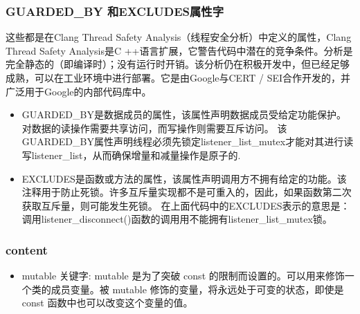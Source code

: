 \begin{frame}
\frametitle{GUARDED\_BY 和EXCLUDES属性字}


这些都是在Clang Thread Safety Analysis（线程安全分析）中定义的属性，Clang Thread Safety Analysis是C ++语言扩展，它警告代码中潜在的竞争条件。分析是完全静态的（即编译时）；没有运行时开销。该分析仍在积极开发中，但已经足够成熟，可以在工业环境中进行部署。它是由Google与CERT / SEI合作开发的，并广泛用于Google的内部代码库中。
\begin{itemize}
	\item GUARDED\_BY是{\color{red}数据成员}的属性，该属性声明数据成员受给定功能保护。{\color{red}对数据的读操作需要共享访问，而写操作则需要互斥访问}。
该GUARDED\_BY属性声明线程必须先锁定listener\_list\_mutex才能对其进行读写listener\_list，从而确保增量和减量操作是原子的.
	\item EXCLUDES是{\color{red}函数或方法}的属性，该属性声明调用方不拥有给定的功能。该注释{\color{red}用于防止死锁}。许多互斥量实现都不是可重入的，因此，如果函数第二次获取互斥量，则可能发生死锁。
在上面代码中的EXCLUDES表示的意思是：调用listener\_disconnect()函数的调用用不能拥有listener\_list\_mutex锁。

\end{itemize}
\end{frame}

\begin{frame}
\frametitle{content}
\begin{itemize}
	\item mutable 关键字: mutable 是为了突破 const 的限制而设置的。可以用来修饰一个类的成员变量。被 mutable 修饰的变量，将永远处于可变的状态，即使是 const 函数中也可以改变这个变量的值。
\end{itemize}
\end{frame}






